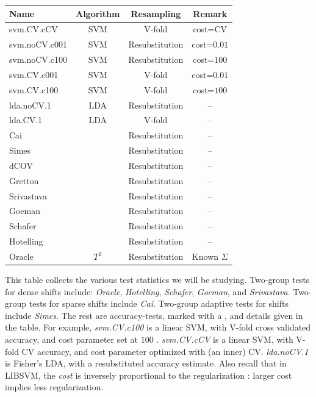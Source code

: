 \documentclass[]{bio}
\begin{document}
\begin{tcolorbox}
	\centering
	\footnotesize
	\begin{tabular}{l|c|c|c}
		Name & Algorithm & Resampling & Remark\\ 
		\hline
		\hline
		\cue svm.CV.cCV 	& SVM & V-fold  & cost=CV \\ 
		\cue svm.noCV.c001 	& SVM & Resubstitution  & cost=$0.01$ \\ 
		\cue svm.noCV.c100 	& SVM & Resubstitution  & cost=$100$ \\ 
		\cue svm.CV.c001	& SVM & V-fold 		    & cost=$0.01$ \\ 
		\cue svm.CV.c100	& SVM & V-fold 		    & cost=$100$ \\ 
		\cue lda.noCV.1 	& LDA & Resubstitution 	&  --\\ 
		\cue lda.CV.1 	& LDA & V-fold 			&  -- \\ 
		Cai & \cite{cai_two-sample_2013} & Resubstitution & -- \\ 
		Simes & \cite{simes1986improved} & Resubstitution & -- \\ 
		dCOV & \cite{szekely2004testing} & Resubstitution & -- \\ 
		Gretton & \cite{gretton_kernel_2012-1} & Resubstitution & -- \\ 
		Srivastava & \cite{srivastava_test_2008} & Resubstitution & -- \\ 
		Goeman & \cite{goeman2006testing} & Resubstitution & -- \\ 
		Schafer & \cite{schafer_shrinkage_2005} & Resubstitution & -- \\ 
		Hotelling & \cite{hotelling_generalization_1931} & Resubstitution & -- \\
		Oracle & $T^2$ & Resubstitution & Known $\Sigma$\\ 
	\end{tabular} 
	\captionsetup{type=table}
	\caption{\footnotesize
		This table collects the various test statistics we will be studying. 
		Two-group tests for dense shifts include: \textit{Oracle}, \textit{Hotelling}, \textit{Schafer}, \textit{Goeman}, and \textit{Srivastava}.
		Two-group tests for sparse shifts include \textit{Cai}.
		Two-group adaptive tests for shifts include \textit{Simes}.
		The rest are accuracy-tests, marked with a \cue, and details given in the table. 	
		For example, \textit{svm.CV.c100} is a linear SVM, with V-fold cross validated accuracy, and cost parameter set at $100$ \citep{meyer_e1071:_2015}.
		\textit{svm.CV.cCV} is a linear SVM, with V-fold CV accuracy, and cost parameter optimized with (an inner) CV. 
		\textit{lda.noCV.1} is Fisher's LDA, with a resubstituted accuracy estimate.
		Also recall that in LIBSVM, the \emph{cost} is inversely proportional to the regularization \citep{chang2011libsvm}: larger cost implies less regularization. 
	}
	\label{tab:collected}
\end{tcolorbox}
\end{document}
